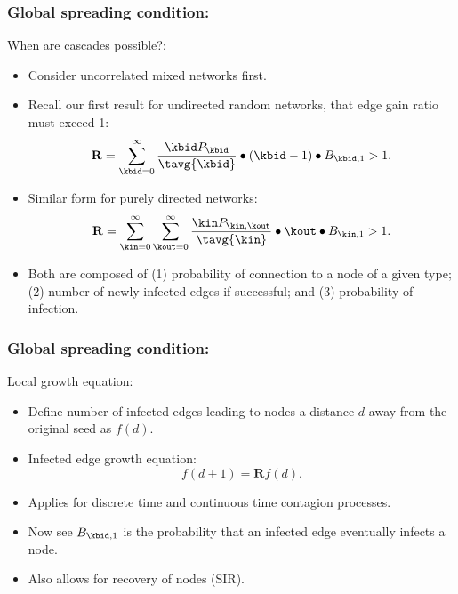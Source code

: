 \begin{frame}
  \frametitle{Global spreading condition:\cite{dodds2011b}}

  \begin{block}{When are cascades possible?:}
    \begin{itemize}
    \item<2->
      Consider uncorrelated mixed networks first.
    \item<3->
      Recall our first result for undirected random networks,
      that edge gain ratio must exceed 1:
      $$
      \mathbf{R}
      =
      \sum_{\kbid=0}^{\infty}
      \frac{\kbid P_{\kbid}}{\tavg{\kbid}}
      \bullet
      (\kbid-1)
      \bullet
      B_{\kbid,1}
      >
      1.
      $$
    \item<4->
      Similar form for purely directed networks:
      $$
      \mathbf{R}
      =
      \sum_{\kin=0}^{\infty}
      \sum_{\kout=0}^{\infty}
      \frac{\kin P_{\kin,\kout}}{\tavg{\kin}}
      \bullet
      \kout
      \bullet
      B_{\kin,1}
      >
      1.
      $$
    \item<5->
      Both are composed of 
      (1) probability of connection
      to a node of a given type;
      (2) number of newly infected edges if successful;
      and 
      (3) probability of infection.
    \end{itemize}
  \end{block}
\end{frame}

\begin{frame}
  \frametitle{Global spreading condition:}
  
  \begin{block}{Local growth equation:}
    \begin{itemize}
    \item<1->
      Define number of infected edges leading
      to nodes a distance $d$ away from the original seed
      as $f(d)$.
    \item<2->
      Infected edge growth equation:
      $$
      f(d+1) = \mathbf{R} f(d).
      $$
    \item<3->
      Applies for discrete time and continuous time contagion
      processes.
    \item<4->
      Now see $B_{\kbid,1}$ is the probability that an infected edge
      eventually infects a node.
    \item<5->
      Also allows for recovery of nodes (SIR).
    \end{itemize}

    
  \end{block}

\end{frame}


